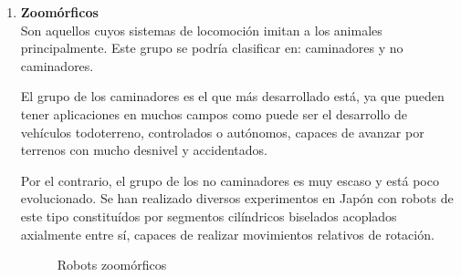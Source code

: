 \begin{enumerate}
\item \textbf{Zoomórficos}\\ Son aquellos cuyos sistemas de locomoción imitan a los animales principalmente. Este grupo se podría clasificar en: caminadores y no caminadores.

El grupo de los caminadores es el que más desarrollado está, ya que pueden tener aplicaciones en muchos campos como puede ser el desarrollo de vehículos todoterreno, controlados o autónomos, capaces de avanzar por terrenos con mucho desnivel y accidentados.

Por el contrario, el grupo de los no caminadores es muy escaso y está poco evolucionado. Se han realizado diversos experimentos en Japón con robots de este tipo constituídos por segmentos cilíndricos biselados acoplados axialmente entre sí, capaces de realizar movimientos relativos de rotación.

\begin{figure}[H]
\centering
{}
\quad
{}
\caption{Robots zoomórficos}
\label{figura24}
\end{figure} 


\end{enumerate}
